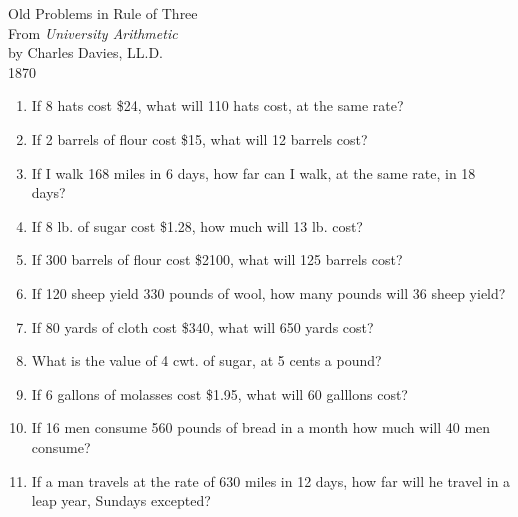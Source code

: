 \documentclass[12pt]{article}
\begin{document}
\pagestyle{empty} %
\begin{center}
          Old Problems in  Rule of Three \\
		From \textit{University Arithmetic} \\ 
		by Charles Davies, LL.D. \\
		1870 %

\end{center}
  \vspace{0.25in}

\begin{enumerate}
		\newcommand{\spacing}{\vspace{0.70in}}
\item If 8 hats cost \$24, what will 110 hats cost, at the same rate? 
\spacing

\item If 2 barrels of flour cost \$15, what will 12 barrels cost? 
\spacing

\item If I walk 168 miles in 6 days, how far can I walk, at the same rate, in 18 days? 
\spacing

\item If 8 lb. of sugar cost \$1.28, how much will 13 lb. cost? 
\spacing

\item If 300 barrels of flour cost \$2100, what will 125 barrels cost? 
\spacing

\item If 120 sheep yield 330 pounds of wool, how many pounds will 36 sheep yield? 
\spacing

\item If 80 yards of cloth cost \$340, what will 650 yards cost? 
\spacing

\item What is the value of 4 cwt. of sugar, at 5 cents a pound? 
\spacing

\item If 6 gallons of molasses cost \$1.95, what will 60 galllons cost? 
\spacing

\item If 16 men consume 560 pounds of bread in a month how much will 40 men consume? 
\spacing

\item If a man travels at the rate of 630 miles in 12 days, how far will he travel in a leap year, Sundays excepted? 
\spacing


\end{enumerate}
\end{document}
